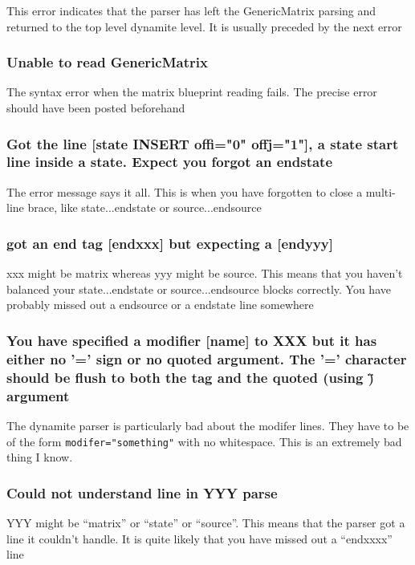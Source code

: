 This error indicates that the parser has left the GenericMatrix parsing
and returned to the top level dynamite level. It is usually preceded by the
next error

\subsubsection{Unable to read GenericMatrix}

The syntax error when the matrix blueprint reading fails. The precise
error should have been posted beforehand

\subsubsection{Got the line [state INSERT offi="0" offj="1"], a state start line
inside a state. Expect you forgot an endstate}

The error message says it all. This is when you have forgotten to close
a multi-line brace, like state...endstate or source...endsource

\subsubsection{got an end tag [endxxx] but expecting a [endyyy]}

xxx might be matrix whereas yyy might be source. This means that
you haven't balanced your state...endstate or source...endsource
blocks correctly. You have probably missed out a endsource or
a endstate line somewhere

\subsubsection{You have specified a modifier [name] to XXX but it has either no '=' sign or no quoted argument. The '=' character should be flush to both the tag and the quoted (using \")  argument}

The dynamite parser is particularly bad about the modifer lines. They have to be of the form
{\tt modifer="something"} with no whitespace. This is an extremely bad thing I know.

\subsubsection{Could not understand line in YYY parse}

YYY might be ``matrix'' or ``state'' or ``source''. This means that the parser got a line it couldn't
handle. It is quite likely that you have missed out a ``endxxxx'' line 

